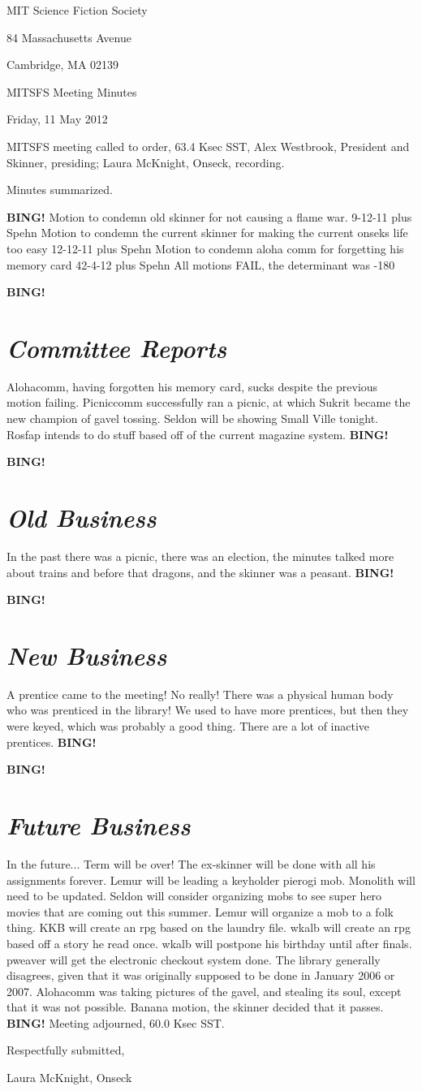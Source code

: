 \documentclass[10pt]{article}
\newcommand{\bing}{{\bf BING!} }
\newcommand{\goto}[1]{\bing \vskip 12pt \section*{{\em{#1}}}}
\newcommand{\ps}{ plus Spehn\xspace}
\newcommand{\skinner}{Alex Westbrook, President and Skinner}
\newcommand{\onseck}{Laura McKnight, Onseck}
\newcommand{\meetingdate}{Friday, 11 May 2012}
\begin{document}
\begin{center}

MIT Science Fiction Society

84 Massachusetts Avenue

Cambridge, MA 02139

\vspace{12pt}

MITSFS Meeting Minutes

\meetingdate

\end{center}

\vspace{18pt}

\setlength{\parskip}{6pt}

\noindent
MITSFS meeting called to order, 63.4 Ksec SST,
\skinner, presiding; \onseck, recording.

Minutes summarized.

\bing
Motion to condemn old skinner for not causing a flame war.
 9-12-11\ps
Motion to condemn the current skinner for making the current onseks life too easy
12-12-11\ps
Motion to condemn aloha comm for forgetting his memory card
42-4-12\ps
All motions FAIL, the determinant was -180

\goto{Committee Reports}
Alohacomm, having forgotten his memory card, sucks despite the previous motion failing. 
Picniccomm successfully ran a picnic, at which Sukrit became the new champion of gavel tossing.
Seldon will be showing Small Ville tonight.
Rosfap intends to do stuff based off of the current magazine system.
\bing

\goto{Old Business}
In the past there was a picnic, there was an election, the minutes talked more about trains and before that dragons, and the skinner was a peasant.
\bing

\goto{New Business}
A prentice came to the meeting! No really! There was a physical human body who was prenticed in the library!
We used to have more prentices, but then they were keyed, which was probably a good thing. There are a lot of inactive prentices.
\bing

\goto{Future Business}
In the future...
\n Term will be over! The ex-skinner will be done with all his assignments forever. Lemur will be leading a keyholder pierogi mob. Monolith will need to be updated. Seldon will consider organizing mobs to see super hero movies that are coming out this summer. Lemur will organize a mob to a folk thing. KKB will create an rpg based on the laundry file. wkalb will create an rpg based off a story he read once. wkalb will postpone his birthday until after finals. pweaver will get the electronic checkout system done. The library generally disagrees, given that it was originally supposed to be done in January 2006 or 2007. Alohacomm was taking pictures of the gavel, and stealing its soul, except that it was not possible. Banana motion, the skinner decided that it passes.
\bing
\noindent
Meeting adjourned, 60.0 Ksec SST.

\vspace{18pt}

\centerline{Respectfully submitted,}
\centerline{\onseck}
\end{document}
